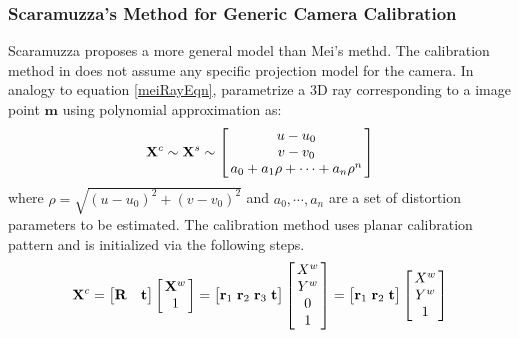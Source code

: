 \documentclass{report}
\begin{document}
\subsubsection{Scaramuzza's Method for Generic Camera Calibration}
Scaramuzza \cite{scaramuzza2006toolbox} proposes a more general model than Mei's methd. The calibration method in \cite{scaramuzza2006toolbox} does not assume any specific projection model for the camera. In analogy to equation \ref{meiRayEqn}, \cite{scaramuzza2006toolbox} parametrize a 3D ray corresponding to a image point $\mathbf{m}$ using polynomial approximation as: 
\begin{equation}
\mathbf{X}^c \sim \mathbf{X}^s \sim
\arraycolsep=1.5pt%
\begin{bmatrix}
	\begin{array}{c}
	u - u_0 \\ v - v_0 \\ a_0 + a_1 \rho + \cdots + a_n \rho^n
	\end{array}
\end{bmatrix} 
\label{scaraRayEqn}
\end{equation}
where $\rho = \sqrt{(u - u_0)^2 + (v - v_0)^2}$ and $a_0, \cdots, a_n$ are a set of distortion parameters to be estimated. The calibration method uses planar calibration pattern and is initialized via the following steps. 
\begin{equation}
\mathbf{X}^c = 
\begin{bmatrix}
\mathbf{R} & \mathbf{t}
\end{bmatrix}
\arraycolsep=1.5pt%
\begin{bmatrix}
	\begin{array}{c}
	\mathbf{X}^w \\ 1
	\end{array}
\end{bmatrix}
= 
\begin{bmatrix}
\mathbf{r}_1 & \mathbf{r}_2 & \mathbf{r}_3 & \mathbf{t}
\end{bmatrix}
\arraycolsep=1.5pt%
\begin{bmatrix}
	\begin{array}{c}
	X^w \\ Y^w \\ 0 \\ 1
	\end{array}
\end{bmatrix}
= 
\begin{bmatrix}
\mathbf{r}_1 & \mathbf{r}_2 & \mathbf{t}
\end{bmatrix}
\arraycolsep=1.5pt%
\begin{bmatrix}
	\begin{array}{c}
	X^w \\ Y^w \\ 1
	\end{array}
\end{bmatrix}
\label{planarEqn}
\end{equation}
\end{document}
